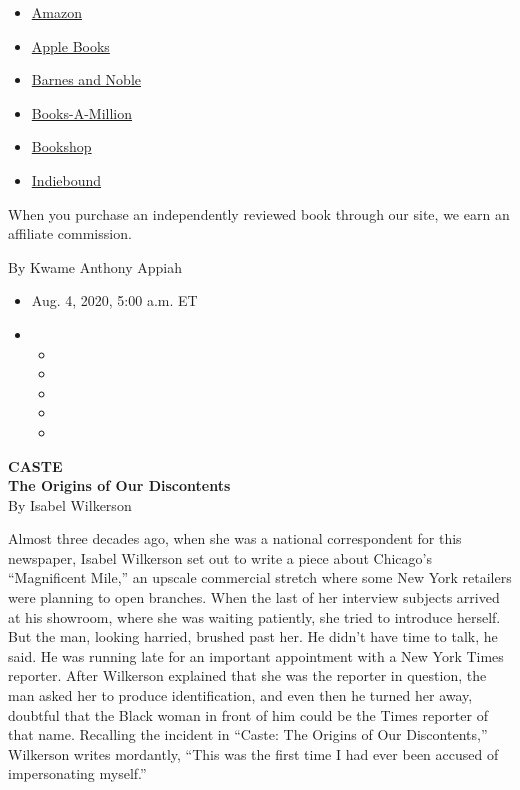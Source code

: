 \begin{itemize}
\tightlist
\item
  \href{https://www.amazon.com/gp/search?index=books\&tag=NYTBSREV-20\&field-keywords=Caste+Isabel+Wilkerson}{Amazon}
\item
  \href{https://du-gae-books-dot-nyt-du-prd.appspot.com/buy?title=Caste\&author=Isabel+Wilkerson}{Apple
  Books}
\item
  \href{https://www.anrdoezrs.net/click-7990613-11819508?url=https\%3A\%2F\%2Fwww.barnesandnoble.com\%2Fw\%2F\%3Fean\%3D9780593230251}{Barnes
  and Noble}
\item
  \href{https://www.anrdoezrs.net/click-7990613-35140?url=https\%3A\%2F\%2Fwww.booksamillion.com\%2Fp\%2FCaste\%2FIsabel\%2BWilkerson\%2F9780593230251}{Books-A-Million}
\item
  \href{https://bookshop.org/a/3546/9780593230251}{Bookshop}
\item
  \href{https://www.indiebound.org/book/9780593230251?aff=NYT}{Indiebound}
\end{itemize}

When you purchase an independently reviewed book through our site, we
earn an affiliate commission.

By Kwame Anthony Appiah

\begin{itemize}
\item
  Aug. 4, 2020, 5:00 a.m. ET
\item
  \begin{itemize}
  \item
  \item
  \item
  \item
  \item
  \end{itemize}
\end{itemize}

\textbf{CASTE}\\
\textbf{The Origins of Our Discontents}\\
By Isabel Wilkerson

Almost three decades ago, when she was a national correspondent for this
newspaper, Isabel Wilkerson set out to write a piece about Chicago's
``Magnificent Mile,'' an upscale commercial stretch where some New York
retailers were planning to open branches. When the last of her interview
subjects arrived at his showroom, where she was waiting patiently, she
tried to introduce herself. But the man, looking harried, brushed past
her. He didn't have time to talk, he said. He was running late for an
important appointment with a New York Times reporter. After Wilkerson
explained that she was the reporter in question, the man asked her to
produce identification, and even then he turned her away, doubtful that
the Black woman in front of him could be the Times reporter of that
name. Recalling the incident in ``Caste: The Origins of Our
Discontents,'' Wilkerson writes mordantly, ``This was the first time I
had ever been accused of impersonating myself.''


